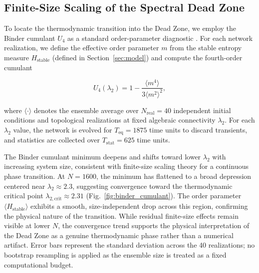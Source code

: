 \documentclass[11pt]{article}
\begin{document}
\subsection{Finite-Size Scaling of the Spectral Dead Zone}
\label{sec:binder_cumulant}

To locate the thermodynamic transition into the Dead Zone, we employ the Binder cumulant $U_4$ as a standard order-parameter diagnostic \cite{binder1981finite}. 
For each network realization, we define the effective order parameter $m$ from the stable entropy measure $H_{\text{stable}}$ (defined in Section~\ref{sec:model}) and compute the fourth-order cumulant

\begin{equation}
U_4(\lambda_2) = 1 - \frac{\langle m^4 \rangle}{3\langle m^2 \rangle^2},
\end{equation}

where $\langle \cdot \rangle$ denotes the ensemble average over $N_{\text{real}} = 40$ independent initial conditions and topological realizations at fixed algebraic connectivity $\lambda_2$. 
For each $\lambda_2$ value, the network is evolved for $T_{\text{eq}} = 1875$ time units to discard transients, and statistics are collected over $T_{\text{stat}} = 625$ time units. 

The Binder cumulant minimum deepens and shifts toward lower $\lambda_2$ with increasing system size, consistent with finite-size scaling theory for a continuous phase transition. At $N=1600$, the minimum has flattened to a broad depression centered near $\lambda_2 \approx 2.3$, suggesting convergence toward the thermodynamic critical point $\lambda_{2,\text{crit}} \approx 2.31$ (Fig.~\ref{fig:binder_cumulant}). The order parameter $\langle H_{\text{stable}} \rangle$ exhibits a smooth, size-independent drop across this region, confirming the physical nature of the transition. While residual finite-size effects remain visible at lower $N$, the convergence trend supports the physical interpretation of the Dead Zone as a genuine thermodynamic phase rather than a numerical artifact. 
Error bars represent the standard deviation across the 40 realizations; no bootstrap resampling is applied as the ensemble size is treated as a fixed computational budget.
\end{document}
